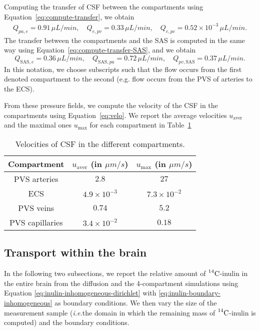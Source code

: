 \documentclass[10pt]{article}
\newcommand{\VV}[1]{\textcolor{red}{VV: #1}}
\newcommand{\ie}{\emph{i.e.}\;}
\newcommand{\1}{^{(1)}}
\newcommand{\2}{^{(2)}}
\newcommand{\Cinulin}{$\prescript{14}{}{\text{C}}$-inulin }
\newcommand{\commentout}[1]{}
\begin{document}
Computing the transfer of CSF between the compartments using Equation~\eqref{eq:compute-transfer}, we obtain 
\[
\begin{aligned}
    Q_{pa,e} =  0.91 \, \si{\mu L/min},\quad Q_{e,pv} = 0.33 \, \si{\mu L/min},\quad Q_{e,pc} = 0.52\times 10^{-3} \, \si{\mu L/min}.
\end{aligned}
\]
The transfer between the compartments and the SAS is computed in the same way using Equation~\eqref{eq:compute-transfer-SAS}, and we obtain
\[
Q_{\text{SAS},e} = 0.36 \, \si{\mu L/min} , \quad Q_{\text{SAS},pa} = 0.72 \, \si{\mu L/min},\quad Q_{pv,\text{SAS}} = 0.37 \, \si{\mu L/min}.
\]
In this notation, we choose subscripts such that the flow occurs from the first denoted compartment to the second (e.g. flow occurs from the PVS of arteries to the ECS). 
\commentout{
\VV{Searching through literature, it seems they report mouse CSF production in nl/min. I found 100 nL/min in~\cite{liu2020direct}.}In other words, it means that every hour, the periarterial space transfers $0.03 \si{mL}$ of CSF to the extracellular space (\ie roughly $13.3\%$ of CSF circulates in the ECS in 1 hour\VV{reference for this?}). 
}

From these pressure fields, we compute the velocity of the CSF in the compartments using Equation~\eqref{eq:velo}. We report the average velocities $u_\text{aver}$ and the maximal ones $u_\text{max}$ for each compartment in Table~\ref{tab:velocities-baseline}

\begin{table}[]
    \centering
    \begin{tabular}{c|c|c}
       Compartment & $u_\text{aver}$ (in $\si{\mu m/s}$) & $u_\text{max}$ (in $\si{\mu m/s}$) \\
       \hline
    
        PVS arteries & $2.8$ & $27$ \\
        ECS &  $4.9\times 10^{-3}$ & $7.3 \times 10^{-2}$ \\
        PVS veins & $0.74$ & $5.2$ \\
        PVS capillaries & $3.4\times 10^{-2}$ & $0.18$
    \end{tabular}
    \caption{Velocities of CSF in the different compartments.}
    \label{tab:velocities-baseline}
\end{table}

\subsection{Transport within the brain}
In the following two subsections, we report the relative amount of \Cinulin in the entire brain from the diffusion and the 4-compartment simulations using Equation \eqref{eq:inulin-inhomogeneous-dirichlet} with \eqref{eq:inulin-boundary-inhomogeneous} as boundary conditions. We then vary the size of the measurement sample (\ie the domain in which the remaining mass of \Cinulin is computed) and the boundary conditions. 
\end{document}
